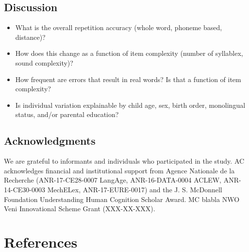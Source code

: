 \documentclass[english,,man,floatsintext]{apa6}
\providecommand{\tightlist}{%
  \setlength{\itemsep}{0pt}\setlength{\parskip}{0pt}}
\begin{document}
\hypertarget{discussion}{%
\subsection{Discussion}\label{discussion}}

\begin{itemize}
\tightlist
\item
  What is the overall repetition accuracy (whole word, phoneme based, distance)?
\item
  How does this change as a function of item complexity (number of syllablex, sound complexity)?
\item
  How frequent are errors that result in real words? Is that a function of item complexity?
\item
  Is individual variation explainable by child age, sex, birth order, monolingual status, and/or parental education?
\end{itemize}

\newpage

\hypertarget{acknowledgments}{%
\subsection{Acknowledgments}\label{acknowledgments}}

We are grateful to informants and individuals who participated in the study. AC acknowledges financial and institutional support from Agence Nationale de la Recherche (ANR-17-CE28-0007 LangAge, ANR-16-DATA-0004 ACLEW, ANR-14-CE30-0003 MechELex, ANR-17-EURE-0017) and the J. S. McDonnell Foundation Understanding Human Cognition Scholar Award. MC blabla NWO Veni Innovational Scheme Grant (XXX-XX-XXX).

\hypertarget{references}{%
\section{References}\label{references}}

\setlength{\parindent}{-0.5in}
\setlength{\leftskip}{0.5in}
\end{document}
